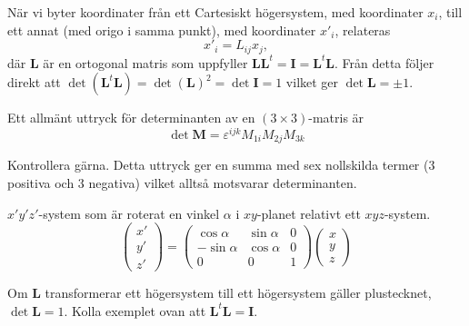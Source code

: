 \documentclass[%
oneside,                 %
final,                   %
10pt]{article}
\newenvironment{warning_mdfboxadmon}[1][]{
\begin{warning_mdfboxmdframed}[frametitle=#1]
}
{
\end{warning_mdfboxmdframed}
}
\begin{document}
När vi byter koordinater från ett Cartesiskt högersystem, med koordinater
$x_i$, till ett annat (med origo i samma punkt), med koordinater $x'_i$, relateras 
\begin{equation}
x'_i=L_{ij}x_j,
\label{eq:transformation}
\end{equation}
där $\mathbf{L}$ är en ortogonal matris som uppfyller $\mathbf{L}\mathbf{L}^t = \mathbf{I}=\mathbf{L}^t\mathbf{L}$. Från detta följer direkt att $\det(\mathbf{L}^t\mathbf{L}) =  \det(\mathbf{L})^2 = \det\mathbf{I}=1$ vilket ger $\det\mathbf{L}=\pm 1$. 

Ett allmänt uttryck för determinanten av en $(3\times3)$-matris är 
\begin{equation}
\det\mathbf{M}=\varepsilon^{ijk}M_{1i}M_{2j}M_{3k}
\end{equation}

\begin{warning_mdfboxadmon}[Kommentar]
Kontrollera gärna. Detta uttryck ger en summa med sex nollskilda termer (3 positiva och 3 negativa) vilket alltså motsvarar determinanten.
\end{warning_mdfboxadmon} %




\begin{warning_mdfboxadmon}[Rita]
$x'y'z'$-system som är roterat en vinkel $\alpha$ i $xy$-planet relativt ett $xyz$-system.
\begin{equation}
\begin{pmatrix}
x' \\ y' \\z'
\end{pmatrix}
= 
\begin{pmatrix}
\cos\alpha & \sin\alpha & 0\\
-\sin\alpha & \cos\alpha & 0 \\
0 & 0 & 1
\end{pmatrix}
\begin{pmatrix}
x \\ y \\ z
\end{pmatrix}
\end{equation}
\end{warning_mdfboxadmon} %




\begin{warning_mdfboxadmon}[Kommentar]
Om $\mathbf{L}$ transformerar ett högersystem till ett högersystem gäller plustecknet, $\det\mathbf{L}=1$. Kolla exemplet ovan att $\mathbf{L}^t \mathbf{L} = \mathbf{I}$.
\end{warning_mdfboxadmon} %
\end{document}
